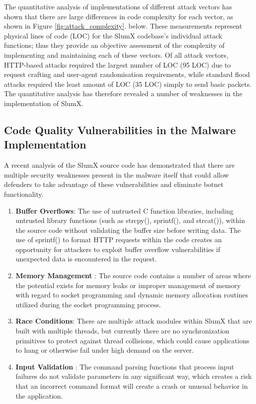 \documentclass[12pt,letterpaper]{report}
\begin{document}
The quantitative analysis of implementations of different attack vectors has shown that there are large differences in code complexity for each vector, as shown in Figure  \ref{fig:attack_complexity}. below. These measurements represent physical lines of code (LOC) for the SlumX codebase's individual attack functions; thus they provide an objective assessment of the complexity of implementing and maintaining each of these vectors. Of all attack vectors, HTTP-based attacks required the largest number of LOC (95 LOC) due to request crafting and user-agent randomisation requirements, while standard flood attacks required the least amount of LOC (35 LOC) simply to send basic packets. The quantitative analysis has therefore revealed a number of weaknesses in the implementation of SlumX. 





\subsection{Code Quality Vulnerabilities in the Malware Implementation}

A recent analysis of the SlumX source code has demonstrated that there are multiple security weaknesses present in the malware itself that could allow defenders to take advantage of these vulnerabilities and eliminate botnet functionality. 

\begin{enumerate}
    \item \textbf{Buffer Overflows}: The use of untrusted C function libraries, including untrusted library functions (such as strcpy(), sprintf(), and strcat()), within the source code without validating the buffer size before writing data. The use of sprintf() to format HTTP requests within the code creates an opportunity for attackers to exploit buffer overflow vulnerabilities if unexpected data is encountered in the request. 
    
    \item \textbf{Memory Management }: The source code contains a number of areas where the potential exists for memory leaks or improper management of memory with regard to socket programming and dynamic memory allocation routines utilized during the socket programming process. 
    
    \item \textbf{Race Conditions}: There are multiple attack modules within SlumX that are built with multiple threads, but currently there are no synchronization primitives to protect against thread collisions, which could cause applications to hang or otherwise fail under high demand on the server. 
    
    \item \textbf{Input Validation }: The command parsing functions that process input failures do not validate parameters in any significant way, which creates a risk that an incorrect command format will create a crash or unusual behavior in the application. 
\end{enumerate}
\end{document}
